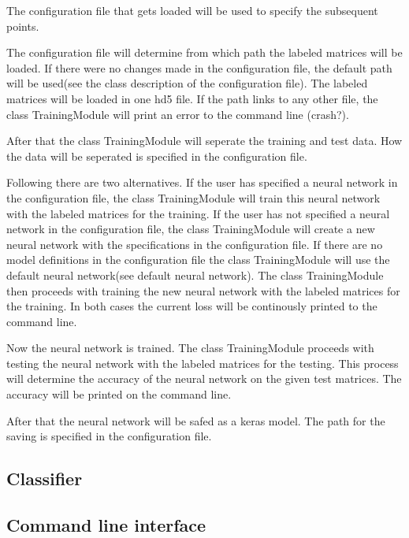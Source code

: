 \documentclass[parskip=full]{scrartcl}
\begin{document}
The configuration file that gets loaded will be used to specify the subsequent points.\newline

The configuration file will determine from which path the labeled matrices will be loaded. If there were no changes made in the configuration file, the default path will be used(see the class description of the configuration file). The labeled matrices will be loaded in one hd5 file. If the path links to any other file, the class TrainingModule will print an error to the command line (crash?). \newline

After that the class TrainingModule will seperate the training and test data. How the data will be seperated is specified in the configuration file.\newline

Following there are two alternatives. If the user has specified a neural network in the configuration file, the class TrainingModule will train this neural network with the labeled matrices for the training. If the user has not specified a neural network in the configuration file, the class TrainingModule will create a new neural network with the specifications in the configuration file. If there are no model definitions in the configuration file the class TrainingModule will use the default neural network(see default neural network). The class TrainingModule then proceeds with training the new neural network with the labeled matrices for the training. In both cases the current loss will be continously printed to the command line.\newline

Now the neural network is trained. The class TrainingModule proceeds with testing the neural network with the labeled matrices for the testing. This process will determine the accuracy of the neural network on the given test matrices. The accuracy will be printed on the command line.\newline

After that the neural network will be safed as a keras model. The path for the saving is specified in the configuration file.




\subsection{Classifier}
\subsection{Command line interface}
\end{document}
